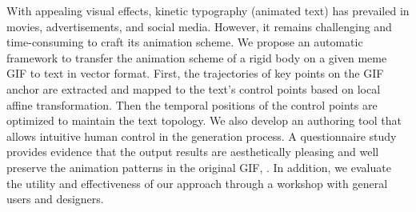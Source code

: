 With appealing visual effects, kinetic typography (animated text) has prevailed in movies, advertisements, and social media.
However, it remains challenging and time-consuming to craft its animation scheme.
We propose an automatic framework to transfer the animation scheme of a rigid body on a given meme GIF to text in vector format.
First, the trajectories of key points on the GIF anchor are extracted and mapped to the text's control points based on local affine transformation.
Then the temporal positions of the control points are optimized to maintain the text topology.
We also develop an authoring tool that allows intuitive human control in the generation process.
A questionnaire study provides evidence that the output results are aesthetically pleasing and well preserve the animation patterns in the original GIF, .
In addition, we evaluate the utility and effectiveness of our approach through a workshop with general users and designers.


